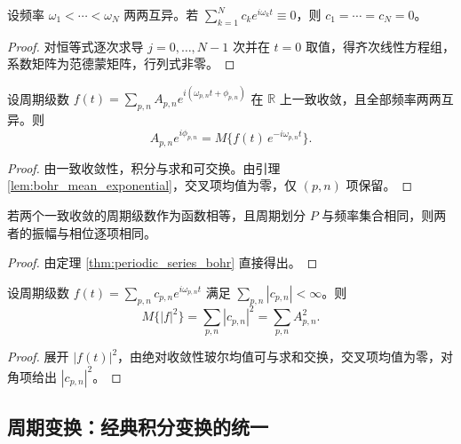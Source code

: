\begin{proposition}\label{prop:vandermonde_uniqueness}
设频率 $\omega_1 < \cdots < \omega_N$ 两两互异。若 $\sum_{k=1}^{N} c_k e^{i\omega_k t} \equiv 0$，则 $c_1 = \cdots = c_N = 0$。
\end{proposition}

\begin{proof}
对恒等式逐次求导 $j = 0, \dots, N-1$ 次并在 $t = 0$ 取值，得齐次线性方程组，系数矩阵为范德蒙矩阵，行列式非零。
\end{proof}

\begin{theorem}[周期级数系数的确定（玻尔）]\label{thm:periodic_series_bohr}
设周期级数 $f(t) = \sum_{p,n} A_{p,n} e^{i(\omega_{p,n} t + \phi_{p,n})}$ 在 $\mathbb{R}$ 上一致收敛，且全部频率两两互异。则
\[
A_{p,n} e^{i\phi_{p,n}} = M\big\{ f(t)\, e^{-i\omega_{p,n} t} \big\}.
\]
\end{theorem}

\begin{proof}
由一致收敛性，积分与求和可交换。由引理 \ref{lem:bohr_mean_exponential}，交叉项均值为零，仅 $(p,n)$ 项保留。
\end{proof}

\begin{corollary}[表示的唯一性]\label{cor:periodic_series_unique}
若两个一致收敛的周期级数作为函数相等，且周期划分 $P$ 与频率集合相同，则两者的振幅与相位逐项相同。
\end{corollary}

\begin{proof}
由定理 \ref{thm:periodic_series_bohr} 直接得出。
\end{proof}

\begin{theorem}[广义帕塞瓦尔恒等式（玻尔）]\label{thm:bohr_parseval}
设周期级数 $f(t) = \sum_{p,n} c_{p,n} e^{i\omega_{p,n} t}$ 满足 $\sum_{p,n} |c_{p,n}| < \infty$。则
\[
M\{|f|^2\} = \sum_{p,n} |c_{p,n}|^2 = \sum_{p,n} A_{p,n}^2.
\]
\end{theorem}

\begin{proof}
展开 $|f(t)|^2$，由绝对收敛性玻尔均值可与求和交换，交叉项均值为零，对角项给出 $|c_{p,n}|^2$。
\end{proof}

\subsection{\texorpdfstring{周期变换：经典积分变换的统一}{周期变换}}

